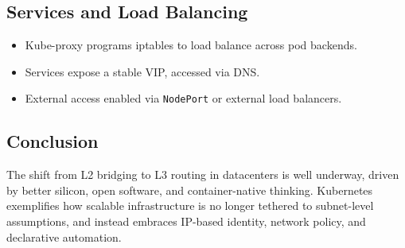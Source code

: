 \documentclass[../../../OAE-SPEC-MAIN.tex]{subfiles}
\begin{document}
\subsection{Services and Load Balancing}

\begin{itemize}
  \item Kube-proxy programs iptables to load balance across pod backends.
  \item Services expose a stable VIP, accessed via DNS.
  \item External access enabled via \texttt{NodePort} or external load balancers.
\end{itemize}

\subsection{Conclusion}

The shift from L2 bridging to L3 routing in datacenters is well underway, driven by better silicon, open software, and container-native thinking. Kubernetes exemplifies how scalable infrastructure is no longer tethered to subnet-level assumptions, and instead embraces IP-based identity, network policy, and declarative automation.

%
%
%	


\end{document}
